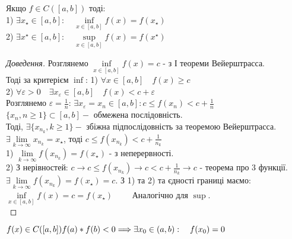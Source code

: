 \documentclass[14pt,a4paper]{scrartcl}
\theoremstyle{definition}
\theoremstyle{remark}
\theoremstyle{definition}
\theoremstyle{definition}
\begin{document}
\begin{boxteo} 
Якщо $f \in C([a,b]) $ тоді:\\
1) $\exists x_{\star} \in [a,b]: \quad \inf\limits_{x\in [a,b]}{f(x)}= f(x_{\star})$\\
2) $\exists x^{\star} \in [a,b]: \quad \sup\limits_{x\in [a,b]}{f(x)}= f(x^{\star})$
\end{boxteo}
\begin{proof}[Доведення]
  Розглянемо $\inf\limits_{x\in [a,b]}{f(x)} = c $ - з І теореми Вейерштрасса.\\
  Тоді за критерієм $\inf$: 1) $\forall x \in [a,b] \quad f(x) \geq c$ \\
  2) $\forall \varepsilon > 0 \quad \exists x_{\varepsilon } \in [a,b] \quad f(x) < c+ \varepsilon $ \\
  Розглянемо $\varepsilon = \frac{1}{n} $:\quad
  $\exists x_{\varepsilon } = x_n \in [a,b] : c\leq f(x_n) < c + \frac{1}{n}  $\\
  $\lbrace x_n, n \geq 1\rbrace \subset [a,b] -$ обмежена послідовність.\\
  Тоді, $\exists \lbrace x_{n_k} , k \geq 1 \rbrace -$ збіжна підпослідовність за теоремою Вейерштрасса.\\
  $\exists  \lim\limits_{k\to  \infty}{x_{n_k}} = x_{\star}$, тоді $c \leq f(x_{n_k}) < c + \frac{1}{n_k}$ \\
  1) $ \lim\limits_{k\to  \infty}{f(x_{n_k})} = f(x_{\star}) $ - з неперервності. \\
  2) З нерівностей: $c \to c \leq f(x_{n_k}) \to c < c + \frac{1}{n_{k}} \to c $ - теорема про 3 функції.\\
  $\exists  \lim\limits_{k\to  \infty}{f(x_{n_k})} = f(x_{\star}) = c$. З 1) та 2) та єдності границі маємо:\\ $\inf\limits_{x\in [a,b] }{f(x)} = c = f(x_{\star})\qquad$ Аналогічно для $\sup{}.$\\
\end{proof}
\begin{boxteo}
  $f(x) \in C([a,b])\quad\\ f(a)*f(b) < 0 \Longrightarrow \exists x_0 \in (a,b): \quad f(x_0) = 0$\\
\end{boxteo}
\end{document}

